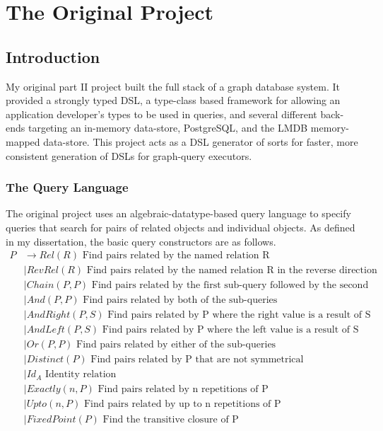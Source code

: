 \documentclass{report}
\newcommand \2[0]{\textbf{2}}
\newcommand \3[0]{\textbf{3}}
\begin{document}
\tableofcontents
\newpage

\chapter{The Original Project}
\section{Introduction}
My original part II project built the full stack of a graph database system. It provided a strongly typed DSL, a type-class based framework for allowing an application developer's types to be used in queries, and several different back-ends targeting an in-memory data-store, PostgreSQL, and the LMDB memory-mapped data-store. This project acts as a DSL generator of sorts for faster, more consistent generation of DSLs for graph-query executors.
\subsection{The Query Language}
The original project uses an algebraic-datatype-based query language to specify queries that search for pairs of related objects and individual objects. As defined in my dissertation, the basic query constructors are as follows.
\begin{equation}
    \label{PDefinition}
    \begin{split}
    P  &\rightarrow Rel(R) \mbox{ Find pairs related by the named relation R}\\
    &\mid RevRel(R) \mbox{ Find pairs related by the named relation R in the reverse direction}\\
    &\mid Chain(P, P) \mbox{   Find pairs related by the first sub-query followed by the second}\\
    &\mid And(P, P) \mbox{  Find pairs related by both of the sub-queries}\\
    &\mid AndRight(P, S) \mbox{  Find pairs related by P where the right value is a result of S}\\
    &\mid AndLeft(P, S) \mbox{  Find pairs related by P where the left value is a result of S}\\
    &\mid Or(P, P) \mbox{  Find pairs related by either of the sub-queries}\\
    &\mid Distinct(P) \mbox{  Find pairs related by P that are not symmetrical}\\
    &\mid Id_A \mbox{ Identity relation}\\
    &\mid Exactly(\mathit{n}, P) \mbox{  Find pairs related by n repetitions of P}\\
    &\mid Upto(\mathit{n}, P) \mbox{  Find pairs related by up to n repetitions of P}\\
    &\mid FixedPoint(P) \mbox{  Find the transitive closure of P}\\
    \end{split}
    \end{equation} 
\end{document}
